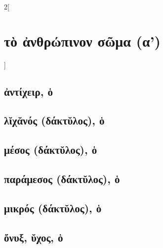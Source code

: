 \documentclass{book}
\begin{document}
\begin{multicols}{2}[\section{τὸ ἀνθρώπινον σῶμα (α')}]
\subsection{ἀντίχειρ, ὁ}
\subsection{λῐχᾰνός (δάκτῠλος), ὁ}
\subsection{μέσος (δάκτῠλος), ὁ}
\subsection{παράμεσος (δάκτῠλος), ὁ}
\subsection{μικρός (δάκτῠλος), ὁ}
\subsection{ὄνυξ, ῠχος, ὁ}
~

\end{multicols}
\newpage
\end{document}
